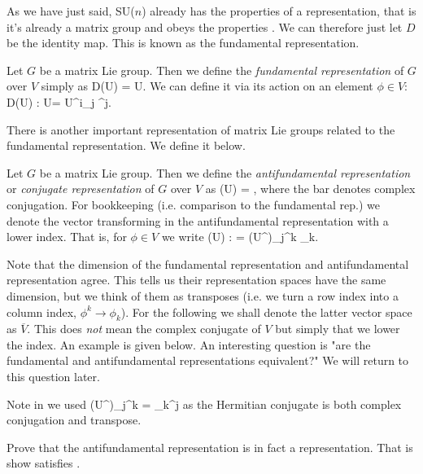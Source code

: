 As we have just said, SU($n$) already has the properties of a representation, that is it's already a matrix group and obeys the properties . We can therefore just let $D$ be the identity map. This is known as the fundamental representation. 

    Let $G$ be a matrix Lie group. Then we define the \textit{fundamental representation} of $G$ over $V$ simply as 
    \be 
    \label{eqn:FundamentalRepGroup}
        D(U) = U.
    \ee 
    We can define it via its action on an element $\phi\in V$:
    \be 
    \label{eqn:FundamentalRepGroupAction}
        D(U) : \phi \mapsto U\phi = {U^i}_j \phi^j.
    \ee 
\ed 

There is another important representation of matrix Lie groups related to the fundamental representation. We define it below. 

    Let $G$ be a matrix Lie group. Then we define the \textit{antifundamental representation} or \textit{conjugate representation} of $G$ over $V$ as
    \be 
    \label{eqn:AntifundamentalRepGroup}
        (U) = ,
    \ee 
    where the bar denotes complex conjugation. For bookkeeping (i.e. comparison to the fundamental rep.) we denote the vector transforming in the antifundamental representation with a lower index. That is, for $\phi\in V$ we write 
    \be
    \label{eqn:AntifundamentalRepGroupAction}
        (U) : \phi \mapsto {}\phi = {(U^{\dagger})_j}^k \phi_k.
    \ee 
\ed 

Note that the dimension of the fundamental representation and antifundamental representation agree. This tells us their representation spaces have the same dimension, but we think of them as transposes (i.e. we turn a row index into a column index, $\phi^k \to \phi_k$). For the following we shall denote the latter vector space as $\overline{V}$. This does \textit{not} mean the complex conjugate of $V$ but simply that we lower the index. An example is given below. An interesting question is "are the fundamental and antifundamental representations equivalent?" We will return to this question later. 

\br 
    Note in  we used 
    \bse 
        {(U^{\dagger})_j}^k = {_k}^j
    \ese 
    as the Hermitian conjugate is both complex conjugation and transpose. 
\er 

\bbox 
    Prove that the antifundamental representation is in fact a representation. That is show  satisfies .
\ebox 

